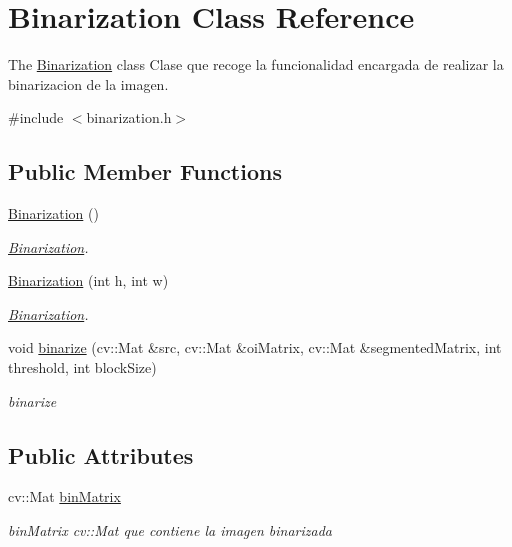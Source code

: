 \hypertarget{class_binarization}{\section{Binarization Class Reference}
\label{class_binarization}
}


The \hyperlink{class_binarization}{Binarization} class Clase que recoge la funcionalidad encargada de realizar la binarizacion de la imagen.  




{\ttfamily \#include $<$binarization.\+h$>$}

\subsection*{Public Member Functions}
\begin{DoxyCompactItemize}
\item 
\hypertarget{class_binarization_a2227910fd9f1600f0f31c65285a8fc08}{\hyperlink{class_binarization_a2227910fd9f1600f0f31c65285a8fc08}{Binarization} ()}\label{class_binarization_a2227910fd9f1600f0f31c65285a8fc08}

\begin{DoxyCompactList}\small\item\em \hyperlink{class_binarization}{Binarization}. \end{DoxyCompactList}\item 
\hyperlink{class_binarization_a8ee0e3bd1fbc4347b1e34f9409970bb6}{Binarization} (int h, int w)
\begin{DoxyCompactList}\small\item\em \hyperlink{class_binarization}{Binarization}. \end{DoxyCompactList}\item 
void \hyperlink{class_binarization_a7cf4b278e99a38c12da399e33cc690cf}{binarize} (cv\+::\+Mat \&src, cv\+::\+Mat \&oi\+Matrix, cv\+::\+Mat \&segmented\+Matrix, int threshold, int block\+Size)
\begin{DoxyCompactList}\small\item\em binarize \end{DoxyCompactList}\end{DoxyCompactItemize}
\subsection*{Public Attributes}
\begin{DoxyCompactItemize}
\item 
\hypertarget{class_binarization_a4e1c66ac5f6ded0bfd845039025483ed}{cv\+::\+Mat \hyperlink{class_binarization_a4e1c66ac5f6ded0bfd845039025483ed}{bin\+Matrix}}\label{class_binarization_a4e1c66ac5f6ded0bfd845039025483ed}

\begin{DoxyCompactList}\small\item\em bin\+Matrix cv\+::\+Mat que contiene la imagen binarizada \end{DoxyCompactList}\end{DoxyCompactItemize}


